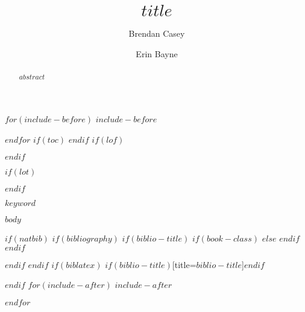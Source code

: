 \documentclass[review]{elsarticle}
\begin{document}
$for(include-before)$
$include-before$

$endfor$
$if(toc)$
{
\setcounter{tocdepth}{$toc-depth$}
\tableofcontents
}
$endif$
$if(lof)$
\listoffigures
$endif$

$if(lot)$
\listoftables
$endif$


\title{$title$}
\author[mymainaddress]{Brendan Casey}
\author[mymainaddress]{Erin Bayne}


\address[mymainaddress]{Department of Biological Sciences, University of Alberta, Canada}

\begin{frontmatter}

\begin{abstract}
$abstract$
\end{abstract}


\begin{keyword}
$keyword$
\end{keyword}

\end{frontmatter}

\linenumbers

$body$

$if(natbib)$
$if(bibliography)$
$if(biblio-title)$
$if(book-class)$
\renewcommand\bibname{$biblio-title$}
$else$
\renewcommand\refname{$biblio-title$}
$endif$
$endif$




$endif$
$endif$
$if(biblatex)$
\printbibliography$if(biblio-title)$[title=$biblio-title$]$endif$

$endif$
$for(include-after)$
$include-after$

$endfor$
\end{document}
